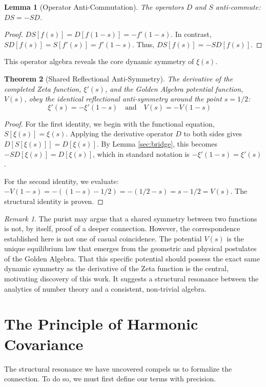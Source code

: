 \documentclass{article}
\theoremstyle{plain}
\newtheorem{theorem}{Theorem}[section]
\newtheorem{lemma}[theorem]{Lemma}
\theoremstyle{definition}
\theoremstyle{remark}
\newtheorem*{remark}{Remark}
\begin{document}
\begin{lemma}[Operator Anti-Commutation]
The operators $D$ and $S$ anti-commute: $DS = -SD$.
\end{lemma}
\begin{proof}
$DS[f(s)] = D[f(1-s)] = -f'(1-s)$. In contrast, $SD[f(s)] = S[f'(s)] = f'(1-s)$. Thus, $DS[f(s)] = -SD[f(s)]$.
\end{proof}

This operator algebra reveals the core dynamic symmetry of $\xi(s)$.

\begin{theorem}[Shared Reflectional Anti-Symmetry]
The derivative of the completed Zeta function, $\xi'(s)$, and the Golden Algebra potential function, $V(s)$, obey the identical reflectional anti-symmetry around the point $s=1/2$:
$$ \xi'(s) = -\xi'(1-s) \quad \text{and} \quad V(s) = -V(1-s) \quad \text{}$$
\end{theorem}
\begin{proof}
For the first identity, we begin with the functional equation, $S[\xi(s)] = \xi(s)$. Applying the derivative operator $D$ to both sides gives $D[S[\xi(s)]] = D[\xi(s)]$. By Lemma \ref{sec:bridge}, this becomes $-SD[\xi(s)] = D[\xi(s)]$, which in standard notation is $-\xi'(1-s) = \xi'(s)$.

For the second identity, we evaluate: $-V(1-s) = -((1-s) - 1/2) = -(1/2 - s) = s - 1/2 = V(s)$. The structural identity is proven.
\end{proof}

\begin{remark}
The purist may argue that a shared symmetry between two functions is not, by itself, proof of a deeper connection. However, the correspondence established here is not one of casual coincidence. The potential $V(s)$ is the unique equilibrium law that emerges from the geometric and physical postulates of the Golden Algebra. That this specific potential should possess the exact same dynamic symmetry as the derivative of the Zeta function is the central, motivating discovery of this work. It suggests a structural resonance between the analytics of number theory and a consistent, non-trivial algebra.
\end{remark}


\section{The Principle of Harmonic Covariance}
\label{sec:covariance}

The structural resonance we have uncovered compels us to formalize the connection. To do so, we must first define our terms with precision.
\end{document}
